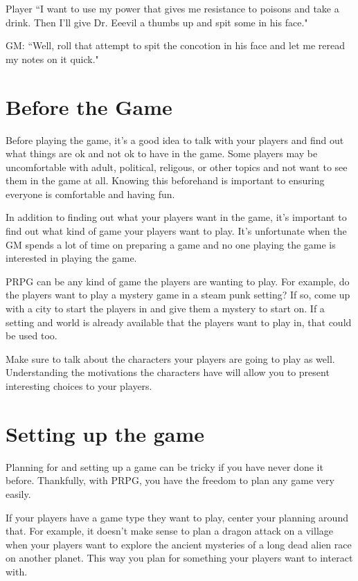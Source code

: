 \begin{flushleft}
Player ``I want to use my power that gives me resistance to poisons and take a
drink. Then I'll give Dr. Eeevil a thumbs up and spit some in his face."

GM: ``Well, roll that attempt to spit the concotion in his face and let me
reread my notes on it quick."

\section*{Before the Game}

Before playing the game, it's a good idea to talk with your players and find out
what things are ok and not ok to have in the game. Some players may be
uncomfortable with adult, political, religous, or other topics and not want to
see them in the game at all. Knowing this beforehand is important to ensuring
everyone is comfortable and having fun.

In addition to finding out what your players want in the game, it's important
to find out what kind of game your players want to play. It's unfortunate when
the GM spends a lot of time on preparing a game and no one playing the game
is interested in playing the game.

PRPG can be any kind of game the players are wanting to play. For example, do
the players want to play a mystery game in a steam punk setting? If so, come up
with a city to start the players in and give them a mystery to start on.
If a setting and world is already available that the players want to play in,
that could be used too.

Make sure to talk about the characters your players are going to play as well.
Understanding the motivations the characters have will allow you to present
interesting choices to your players.

\section*{Setting up the game}

Planning for and setting up a game can be tricky if you have never done it
before. Thankfully, with PRPG, you have the freedom to plan any game very
easily.

If your players have a game type they want to play, center your planning around
that. For example, it doesn't make sense to plan a dragon attack on a village
when your players want to explore the ancient mysteries of a long dead alien
race on another planet. This way you plan for something your players want to
interact with.


\end{flushleft}
